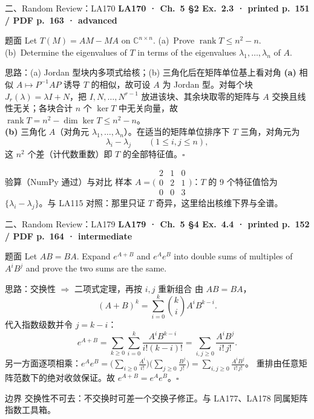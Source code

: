 \documentclass[aspectratio=169,10pt,fontset=none]{ctexbeamer}
\newcommand{\ex}[1]{\textcolor{accent}{\footnotesize\bfseries #1}}
\begin{document}
\begin{frame}[t]{二、Random Review：LA170}
  \leavevmode\ex{LA170 · Ch.~5 §2 Ex.~2.3 · printed p.~151 / PDF p.~163 · advanced}
  \begin{block}{\footnotesize 题面}
    \scriptsize Let $T(M)=AM-MA$ on $\mathbb C^{n\times n}$. (a)~Prove $\operatorname{rank}T\le n^2-n$. (b)~Determine the eigenvalues of $T$ in terms of the eigenvalues $\lambda_1,\ldots,\lambda_n$ of $A$.
  \end{block}
  \begin{exampleblock}{\footnotesize 思路：(a) Jordan 型块内多项式给核；(b) 三角化后在矩阵单位基上看对角}
    \scriptsize
    \textbf{(a)} 相似 $A\mapsto P^{-1}AP$ 诱导 $T$ 的相似，故可设 $A$ 为 Jordan 型。对每个块 $J_r(\lambda)=\lambda I+N$，把 $I,N,\ldots,N^{r-1}$ 放进该块、其余块取零的矩阵与 $A$ 交换且线性无关；各块合计 $n$ 个 $\ker T$ 中无关向量，故 $\operatorname{rank}T=n^2-\dim\ker T\le n^2-n$。\\
    \textbf{(b)} 三角化 $A$（对角元 $\lambda_1,\ldots,\lambda_n$）。在适当的矩阵单位排序下 $T$ 三角，对角元为
    $$\lambda_i-\lambda_j\qquad(1\le i,j\le n),$$
    这 $n^2$ 个差（计代数重数）即 $T$ 的全部特征值。$\square$
  \end{exampleblock}
  \begin{block}{\footnotesize 验算（NumPy 通过）与对比}
    \scriptsize 样本 $A=\bigl(\begin{smallmatrix}2&1&0\\0&2&1\\0&0&3\end{smallmatrix}\bigr)$：$T$ 的 9 个特征值恰为 $\{\lambda_i-\lambda_j\}$。与 LA115 对照：那里只证 $T$ 奇异，这里给出核维下界与全谱。
  \end{block}
\end{frame}

\begin{frame}[t]{二、Random Review：LA179}
  \leavevmode\ex{LA179 · Ch.~5 §4 Ex.~4.4 · printed p.~152 / PDF p.~164 · intermediate}
  \begin{block}{\footnotesize 题面}
    \scriptsize Let $AB=BA$. Expand $e^{A+B}$ and $e^Ae^B$ into double sums of multiples of $A^iB^j$ and prove the two sums are the same.
  \end{block}
  \begin{exampleblock}{\footnotesize 思路：交换性 $\Rightarrow$ 二项式定理，再按 $i,j$ 重新组合}
    \scriptsize
    由 $AB=BA$，
    $$(A+B)^k=\sum_{i=0}^k\binom kiA^iB^{k-i}.$$
    代入指数级数并令 $j=k-i$：
    $$e^{A+B}=\sum_{k\ge0}\sum_{i=0}^k\frac{A^iB^{k-i}}{i!(k-i)!}=\sum_{i,j\ge0}\frac{A^iB^j}{i!\,j!}.$$
    另一方面逐项相乘：$e^Ae^B=\big(\sum_{i\ge0}\tfrac{A^i}{i!}\big)\big(\sum_{j\ge0}\tfrac{B^j}{j!}\big)=\sum_{i,j\ge0}\tfrac{A^iB^j}{i!\,j!}$。
    重排由任意矩阵范数下的绝对收敛保证。故 $e^{A+B}=e^Ae^B$。$\square$
  \end{exampleblock}
  \begin{block}{\footnotesize 边界}
    \scriptsize 交换性不可去：不交换时可差一个交换子修正。与 LA177、LA178 同属矩阵指数工具箱。
  \end{block}
\end{frame}
\end{document}
